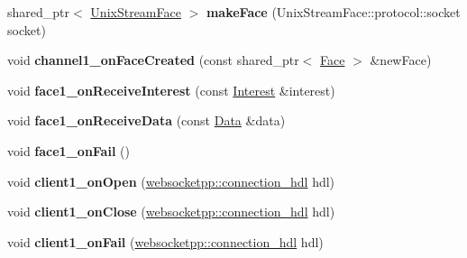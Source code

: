 \begin{DoxyCompactItemize}
\item 
shared\+\_\+ptr$<$ \hyperlink{classnfd_1_1UnixStreamFace}{Unix\+Stream\+Face} $>$ {\bfseries make\+Face} (Unix\+Stream\+Face\+::protocol\+::socket socket)\hypertarget{classnfd_1_1tests_1_1EndToEndFixture_aecaf86e55f15e0a46b5a1510b34225a2}{}\label{classnfd_1_1tests_1_1EndToEndFixture_aecaf86e55f15e0a46b5a1510b34225a2}

\item 
void {\bfseries channel1\+\_\+on\+Face\+Created} (const shared\+\_\+ptr$<$ \hyperlink{classnfd_1_1Face}{Face} $>$ \&new\+Face)\hypertarget{classnfd_1_1tests_1_1EndToEndFixture_aa51312b39e9aaad574ee3f39f1c060f7}{}\label{classnfd_1_1tests_1_1EndToEndFixture_aa51312b39e9aaad574ee3f39f1c060f7}

\item 
void {\bfseries face1\+\_\+on\+Receive\+Interest} (const \hyperlink{classndn_1_1Interest}{Interest} \&interest)\hypertarget{classnfd_1_1tests_1_1EndToEndFixture_a8afa70f742630b0af44adeb83fd31a53}{}\label{classnfd_1_1tests_1_1EndToEndFixture_a8afa70f742630b0af44adeb83fd31a53}

\item 
void {\bfseries face1\+\_\+on\+Receive\+Data} (const \hyperlink{classndn_1_1Data}{Data} \&data)\hypertarget{classnfd_1_1tests_1_1EndToEndFixture_ae32fe6a8257936ef35344807b9aba662}{}\label{classnfd_1_1tests_1_1EndToEndFixture_ae32fe6a8257936ef35344807b9aba662}

\item 
void {\bfseries face1\+\_\+on\+Fail} ()\hypertarget{classnfd_1_1tests_1_1EndToEndFixture_a60bdccb906757aea1547eb85bcf6e89a}{}\label{classnfd_1_1tests_1_1EndToEndFixture_a60bdccb906757aea1547eb85bcf6e89a}

\item 
void {\bfseries client1\+\_\+on\+Open} (\hyperlink{namespacewebsocketpp_a6b3d26a10ee7229b84b776786332631d}{websocketpp\+::connection\+\_\+hdl} hdl)\hypertarget{classnfd_1_1tests_1_1EndToEndFixture_a9b783f44357ea08ae362cbb6e74db0ee}{}\label{classnfd_1_1tests_1_1EndToEndFixture_a9b783f44357ea08ae362cbb6e74db0ee}

\item 
void {\bfseries client1\+\_\+on\+Close} (\hyperlink{namespacewebsocketpp_a6b3d26a10ee7229b84b776786332631d}{websocketpp\+::connection\+\_\+hdl} hdl)\hypertarget{classnfd_1_1tests_1_1EndToEndFixture_abec635f4a0e43d74599481f3aecefb9f}{}\label{classnfd_1_1tests_1_1EndToEndFixture_abec635f4a0e43d74599481f3aecefb9f}

\item 
void {\bfseries client1\+\_\+on\+Fail} (\hyperlink{namespacewebsocketpp_a6b3d26a10ee7229b84b776786332631d}{websocketpp\+::connection\+\_\+hdl} hdl)\hypertarget{classnfd_1_1tests_1_1EndToEndFixture_a96810761b2ae0ef748c4425d5d0fd3e2}{}\label{classnfd_1_1tests_1_1EndToEndFixture_a96810761b2ae0ef748c4425d5d0fd3e2}


\end{DoxyCompactItemize}
